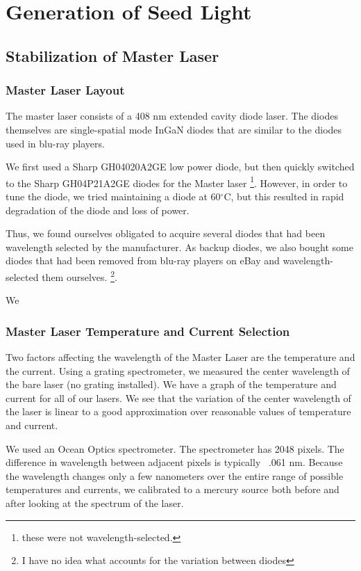   \chapter{Generation of Seed Light}

\section{Stabilization of Master Laser}
\subsection{Master Laser Layout}
The master laser consists of a 408 nm extended cavity diode laser. The diodes themselves are single-spatial mode InGaN diodes that are similar to the diodes used in blu-ray players.

We first used a Sharp GH04020A2GE low power diode, but then quickly switched to the Sharp GH04P21A2GE diodes for the Master laser \footnote{these were not wavelength-selected.}. However, in order to tune the diode, we tried maintaining a diode at 60$^\circ$C, but this resulted in rapid degradation of the diode and loss of power. 

Thus, we found ourselves obligated to acquire several diodes that had been wavelength selected by the manufacturer. As backup diodes, we also bought some diodes that had been removed from blu-ray players on eBay and wavelength-selected them ourselves. \footnote{I have no idea what accounts for the variation between diodes}. 

We 

\subsection{Master Laser Temperature and Current Selection}

Two factors affecting the wavelength of the Master Laser are the temperature and the current. Using a grating spectrometer, we measured the center wavelength of the bare laser (no grating installed). We have a graph of the temperature and current for all of our lasers. We see that the variation of the center wavelength of the laser is linear to a good approximation over reasonable values of temperature and current.

We used an Ocean Optics spectrometer. The spectrometer has 2048 pixels. The difference in wavelength between adjacent pixels is typically ~.061 nm. %
Because the wavelength changes only a few nanometers over the entire range of possible temperatures and currents, we calibrated to a mercury source both before and after looking at the spectrum of the laser. 




